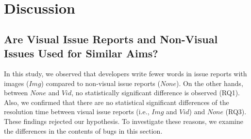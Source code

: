\section{Discussion}



\subsection{Are Visual Issue Reports and Non-Visual Issues Used for Similar Aims?}
In this study, we observed that developers write fewer words in issue reports with images ($Img$) compared to non-visual issue reports ($None$). On the other hands, between $None$ and $Vid$, no statistically significant difference is observed (RQ1). 
Also, we confirmed that there are no statistical significant differences of the resolution time between visual issue reports (i.e., $Img$ and $Vid$) and $None$ (RQ3). These findings rejected our hypothesis. 
To investigate these reasons, we examine the differences in the contents of bugs in this section.

